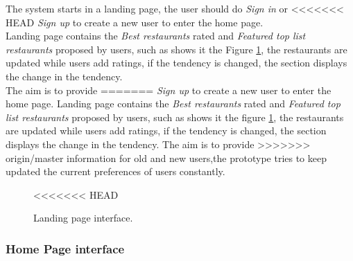 The system starts in a landing page, the user should do \textit{Sign in} or
<<<<<<< HEAD
\textit{Sign up} to create a new user to enter the home page. \\ 
Landing page contains the \textit{Best restaurants} rated and 
\textit{Featured top list restaurants}
proposed by users, such as shows it the Figure  \ref{fig:landing}, 
the restaurants are updated while users add ratings, 
if the tendency is changed, the section displays the change 
in the tendency. \\ The aim is to provide
=======
\textit{Sign up} to create a new user to enter the home page. 
Landing page contains the \textit{Best restaurants} rated and 
\textit{Featured top list restaurants}
proposed by users, such as shows it the figure \ref{fig:landing}, 
the restaurants are updated while users add ratings, 
if the tendency is changed, the section displays the change 
in the tendency. The aim is to provide
>>>>>>> origin/master
information for old and new users,the prototype tries to keep updated
the current preferences of users constantly.
\begin{figure}
\captionsetup{font=footnotesize}
\centering
<<<<<<< HEAD
\caption{Landing page interface.}
\label{fig:landing}   
\end{figure}

\subsubsection{Home Page interface}

